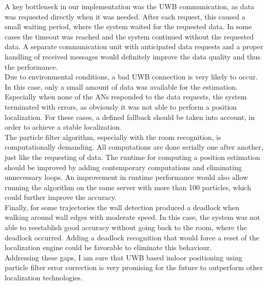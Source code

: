 A key bottleneck in our implementation was the UWB communication, as data was requested directly when it was needed. After each request, this caused a small waiting period, where the system waited for the requested data. In some cases the timeout was reached and the system continued without the requested data. A separate communication unit with anticipated data requests and a proper handling of received messages would definitely improve the data quality and thus the performance.\\
\noindent\hspace*{5mm}%
Due to environmental conditions, a bad UWB connection is very likely to occur. In this case, only a small amount of data was available for the estimation. Especially when none of the ANs responded to the data requests, the system terminated with errors, as obviously it was not able to perform a position localization. For these cases, a defined fallback should be taken into account, in order to achieve a stable localization.\\
\noindent\hspace*{5mm}%
The particle filter algorithm, especially with the room recognition, is computationally demanding. All computations are done serially one after another, just like the requesting of data. The runtime for computing a position estimation should be improved by adding contemporary computations and eliminating unnecessary loops. An improvement in runtime performance would also allow running the algorithm on the same server with more than 100 particles, which could further improve the accuracy.\\
\noindent\hspace*{5mm}%
Finally, for some trajectories the wall detection produced a deadlock when walking around wall edges with moderate speed. In this case, the system was not able to reestablish good accuracy without going back to the room, where the deadlock occurred. Adding a deadlock recognition that would force a reset of the localization engine could be favorable to eliminate this behaviour.\\
\noindent\hspace*{5mm}%
Addressing these gaps, I am sure that UWB based indoor positioning using particle filter error correction is very promising for the future to outperform other localization technologies.